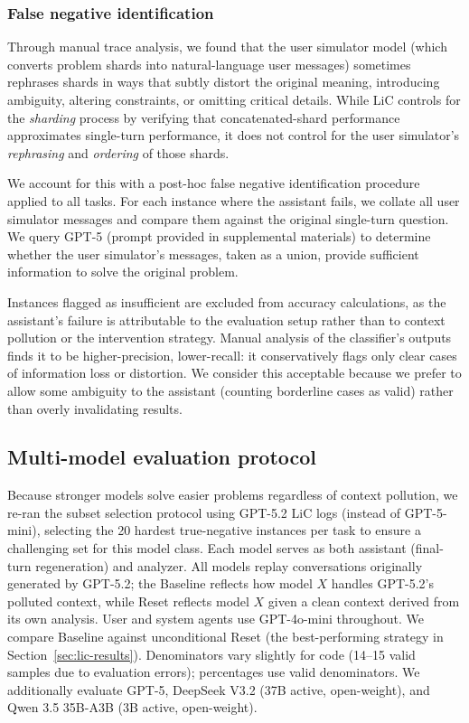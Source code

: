 \documentclass{article} %
\begin{document}
\subsubsection{False negative identification}
\label{app:false-neg}

Through manual trace analysis, we found that the user simulator model (which converts problem shards into natural-language user messages) sometimes rephrases shards in ways that subtly distort the original meaning, introducing ambiguity, altering constraints, or omitting critical details. While LiC controls for the \emph{sharding} process by verifying that concatenated-shard performance approximates single-turn performance, it does not control for the user simulator's \emph{rephrasing} and \emph{ordering} of those shards.

We account for this with a post-hoc false negative identification procedure applied to all tasks. For each instance where the assistant fails, we collate all user simulator messages and compare them against the original single-turn question. We query GPT-5 (prompt provided in supplemental materials) to determine whether the user simulator's messages, taken as a union, provide sufficient information to solve the original problem.

Instances flagged as insufficient are excluded from accuracy calculations, as the assistant's failure is attributable to the evaluation setup rather than to context pollution or the intervention strategy. Manual analysis of the classifier's outputs finds it to be higher-precision, lower-recall: it conservatively flags only clear cases of information loss or distortion. We consider this acceptable because we prefer to allow some ambiguity to the assistant (counting borderline cases as valid) rather than overly invalidating results.

\subsection{Multi-model evaluation protocol}
\label{app:multi-model-protocol}

Because stronger models solve easier problems regardless of context pollution, we re-ran the subset selection protocol using GPT-5.2 LiC logs (instead of GPT-5-mini), selecting the 20 hardest true-negative instances per task to ensure a challenging set for this model class. Each model serves as both assistant (final-turn regeneration) and analyzer. All models replay conversations originally generated by GPT-5.2; the Baseline reflects how model $X$ handles GPT-5.2's polluted context, while Reset reflects model $X$ given a clean context derived from its own analysis. User and system agents use GPT-4o-mini throughout. We compare Baseline against unconditional Reset (the best-performing strategy in Section~\ref{sec:lic-results}). Denominators vary slightly for code (14--15 valid samples due to evaluation errors); percentages use valid denominators. We additionally evaluate GPT-5, DeepSeek V3.2 (37B active, open-weight), and Qwen 3.5 35B-A3B (3B active, open-weight).
\end{document}
